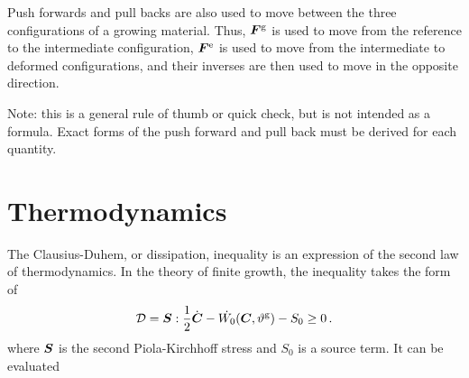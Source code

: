 \documentclass[10pt,letterpaper,oneside]{report}
\newcommand{\ten}[1]{\mbox{\boldmath $#1$}{}}
\newcommand{\scas}[1]{\mbox{{\scriptsize{${\rm{#1}}$}}}{}}
\begin{document}
Push forwards and pull backs are also used to move between the three configurations of a growing material.  Thus, $\ten{F}^{\scas{g}}$ is used to move from the reference to the intermediate configuration, $\ten{F}^{\scas{e}}$ is used to move from the intermediate to deformed configurations, and their inverses are then used to move in the opposite direction. 

Note: this is a general rule of thumb or quick check, but is not intended as a formula.  Exact forms of the push forward and pull back must be derived for each quantity.


\section{Thermodynamics}
The Clausius-Duhem, or dissipation, inequality is an expression of the second law of thermodynamics.  In the theory of finite growth, the inequality takes the form of
\begin{equation}
\mathcal{D} = \ten{S} : \frac{1}{2} \dot{\ten{C}} - \dot{W_0} ( \ten{C}, \vartheta^{\scas{g}} ) - S_0 \geq 0 \, . 
\end{equation}
where $\ten{S}$ is the second Piola-Kirchhoff stress and $S_0$ is a source term. 
It can be evaluated 
\end{document}
